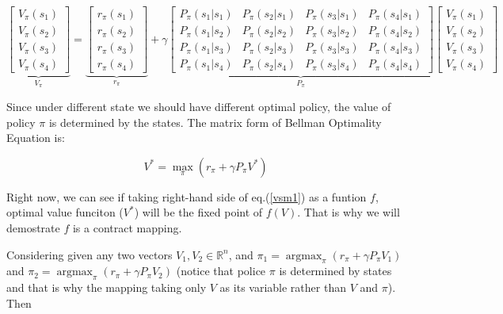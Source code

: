 \begin{equation*}
	\underbrace{\begin{bmatrix}
			V_{\pi}(s_{1}) \\
			V_{\pi}(s_{2}) \\
			V_{\pi}(s_{3}) \\
			V_{\pi}(s_{4})
		\end{bmatrix}}_{V_{\pi}}=
	\underbrace{\begin{bmatrix}
			r_{\pi}(s_{1}) \\
			r_{\pi}(s_{2}) \\
			r_{\pi}(s_{3}) \\
			r_{\pi}(s_{4})
		\end{bmatrix}}_{r_{\pi}}+\gamma
	\underbrace{\begin{bmatrix}
			P_{\pi}(s_{1}|s_{1}) & P_{\pi}(s_{2}|s_{1}) & P_{\pi}(s_{3}|s_{1}) & P_{\pi}(s_{4}|s_{1}) \\
			P_{\pi}(s_{1}|s_{2}) & P_{\pi}(s_{2}|s_{2}) & P_{\pi}(s_{3}|s_{2}) & P_{\pi}(s_{4}|s_{2}) \\
			P_{\pi}(s_{1}|s_{3}) & P_{\pi}(s_{2}|s_{3}) & P_{\pi}(s_{3}|s_{3}) & P_{\pi}(s_{4}|s_{3}) \\
			P_{\pi}(s_{1}|s_{4}) & P_{\pi}(s_{2}|s_{4}) & P_{\pi}(s_{3}|s_{4}) & P_{\pi}(s_{4}|s_{4})
		\end{bmatrix}}_{P_{\pi}}
	\begin{bmatrix}
		V_{\pi}(s_{1}) \\
		V_{\pi}(s_{2}) \\
		V_{\pi}(s_{3}) \\
		V_{\pi}(s_{4})
	\end{bmatrix}
\end{equation*}

Since under different state we should have different optimal policy, the value of policy $\pi$ is determined by the states. The matrix form of
Bellman Optimality Equation is:

\begin{equation}\label{vsm1}
	V^*=\max_{\pi}\left(r_{\pi}+\gamma P_{\pi}V^*\right)
\end{equation}

Right now, we can see if taking right-hand side of eq.(\ref{vsm1}) as a funtion $f$, optimal value funciton ($V^*$) will be the fixed point of
$f(V)$. That is why we will demostrate $f$ is a contract mapping. \par

Considering given any two vectors $V_1,V_2 \in \mathbb{R}^{n}$, and $\pi_{1}=\mathop{\arg\max}_{\pi}(r_{\pi}+\gamma P_{\pi}V_{1})$ and
$\pi_{2}=\mathop{\arg\max}_{\pi}(r_{\pi}+\gamma P_{\pi}V_{2})$ (notice that police $\pi$ is determined by states and that is why the mapping
taking only $V$ as its variable rather than $V$ and $\pi$). Then


